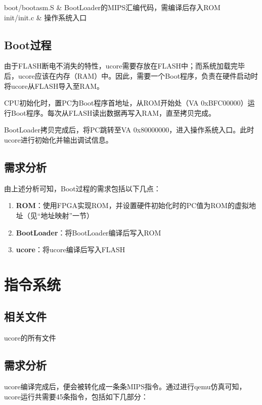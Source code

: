     boot/bootasm.S & BootLoader的MIPS汇编代码，需编译后存入ROM \\
    init/init.c & 操作系统入口 \\
\tableend

\subsection{Boot过程}


由于FLASH断电不消失的特性，ucore需要存放在FLASH中；而系统加载完毕后，ucore应该在内存（RAM）中。因此，需要一个Boot程序，负责在硬件启动时将ucore从FLASH导入至RAM。

CPU初始化时，置PC为Boot程序首地址，从ROM开始处（VA 0xBFC00000）运行Boot程序。每次从FLASH读出数据再写入RAM，直至拷贝完成。

BootLoader拷贝完成后，将PC跳转至VA 0x80000000，进入操作系统入口。此时ucore进行初始化并输出调试信息。

\subsection{需求分析}

由上述分析可知，Boot过程的需求包括以下几点：

\begin{enumerate}
    \item {\bf ROM}：使用FPGA实现ROM，并设置硬件初始化时的PC值为ROM的虚拟地址（见``地址映射''一节）
    \item {\bf BootLoader}：将BootLoader编译后写入ROM
    \item {\bf ucore}：将ucore编译后写入FLASH
\end{enumerate}

\section{指令系统}

\subsection{相关文件}

ucore的所有文件

\subsection{需求分析}

ucore编译完成后，便会被转化成一条条MIPS指令。通过进行qemu仿真可知，ucore运行共需要45条指令，包括如下几部分：


